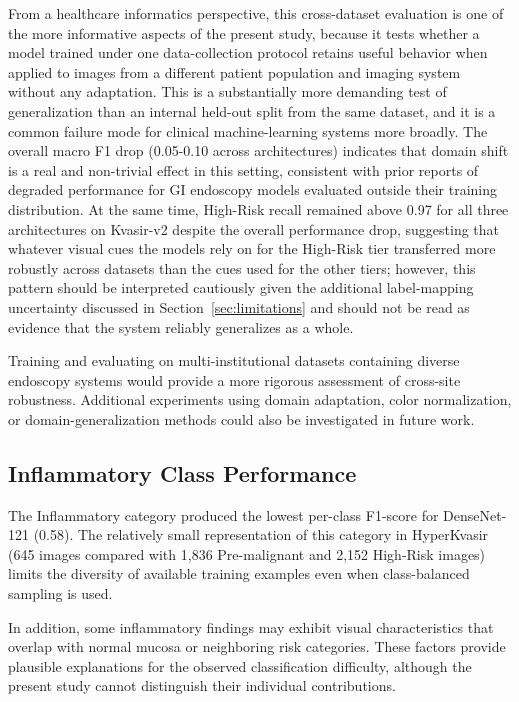 \documentclass[11pt,a4paper]{article}
\begin{document}
From a healthcare informatics perspective, this cross-dataset evaluation is
one of the more informative aspects of the present study, because it tests
whether a model trained under one data-collection protocol retains useful
behavior when applied to images from a different patient population and
imaging system without any adaptation. This is a substantially more
demanding test of generalization than an internal held-out split from the
same dataset, and it is a common failure mode for clinical machine-learning
systems more broadly. The overall macro F1 drop (0.05-0.10 across
architectures) indicates that domain shift is a real and non-trivial effect
in this setting, consistent with prior reports of degraded performance for
GI endoscopy models evaluated outside their training distribution.
At the same time, High-Risk recall remained above 0.97 for all three
architectures on Kvasir-v2 despite the overall performance drop, suggesting
that whatever visual cues the models rely on for the High-Risk tier
transferred more robustly across datasets than the cues used for the other
tiers; however, this pattern should be interpreted cautiously given the
additional label-mapping uncertainty discussed in
Section~\ref{sec:limitations} and should not be read as evidence that the
system reliably generalizes as a whole.

Training and evaluating on multi-institutional datasets containing diverse
endoscopy systems would provide a more rigorous assessment of cross-site
robustness. Additional experiments using domain adaptation, color
normalization, or domain-generalization methods could also be investigated
in future work.

\subsection{Inflammatory Class Performance}

The Inflammatory category produced the lowest per-class F1-score for
DenseNet-121 (0.58). The relatively small representation of this category
in HyperKvasir (645 images compared with 1,836 Pre-malignant and 2,152
High-Risk images) limits the diversity of available training examples even
when class-balanced sampling is used.

In addition, some inflammatory findings may exhibit visual characteristics
that overlap with normal mucosa or neighboring risk categories. These factors
provide plausible explanations for the observed classification difficulty,
although the present study cannot distinguish their individual contributions.
\end{document}
